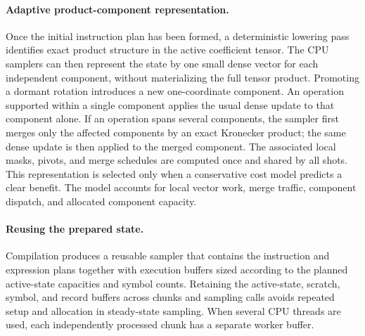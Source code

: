 \documentclass[a4paper,onecolumn,unpublished]{quantumarticle}
\begin{document}
\paragraph{Adaptive product-component representation.}
Once the initial instruction plan has been formed, a deterministic lowering pass identifies exact product structure in the active coefficient tensor.
The CPU samplers can then represent the state by one small dense vector for each independent component, without materializing the full tensor product.
Promoting a dormant rotation introduces a new one-coordinate component. An operation supported within a single component applies the usual dense update to that component alone.
If an operation spans several components, the sampler first merges only the affected components by an exact Kronecker product; the same dense update is then applied to the merged component.
The associated local masks, pivots, and merge schedules are computed once and shared by all shots.
This representation is selected only when a conservative cost model predicts a clear benefit. The model accounts for local vector work, merge traffic, component dispatch, and allocated component capacity.

\paragraph{Reusing the prepared state.}
Compilation produces a reusable sampler that contains the instruction and expression plans together with execution buffers sized according to the planned active-state capacities and symbol counts.
Retaining the active-state, scratch, symbol, and record buffers across chunks and sampling calls avoids repeated setup and allocation in steady-state sampling.
When several CPU threads are used, each independently processed chunk has a separate worker buffer.
\end{document}
